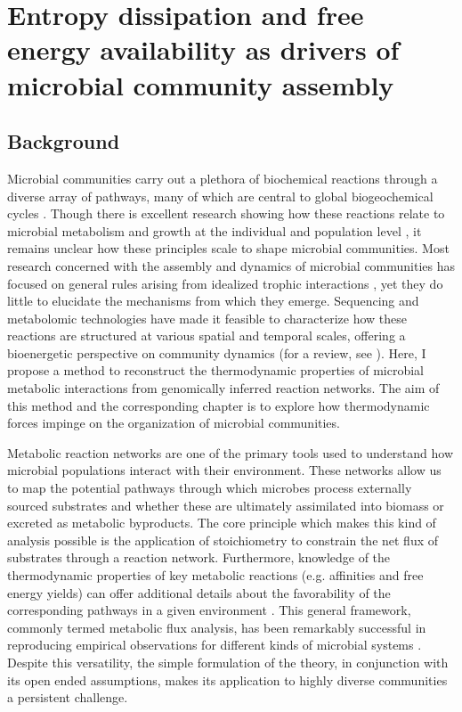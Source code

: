 \chapter{ Entropy dissipation and free energy availability as drivers of microbial community assembly}

\section{Background}

Microbial communities carry out a plethora of biochemical reactions through a diverse array of pathways, many of which are central to global biogeochemical cycles \cite{falkowski_microbial_2008}. Though there is excellent research showing how these reactions relate to microbial metabolism and growth at the individual and population level \cite{tang2017a}, it remains unclear how these principles scale to shape microbial communities. Most research concerned with the assembly and dynamics of microbial communities has focused on general rules arising from idealized trophic interactions \cite{bosi_perspectives_2017, van_den_berg_ecological_2022}, yet they do little to elucidate the mechanisms from which they emerge. Sequencing and metabolomic technologies have made it feasible to characterize how these reactions are structured at various spatial and temporal scales, offering a bioenergetic perspective on community dynamics (for a review, see \cite{kreft_genes_2017}). Here, I propose a method to reconstruct the thermodynamic properties of microbial metabolic interactions from genomically inferred reaction networks. The aim of this method and the corresponding chapter is to explore how thermodynamic forces impinge on the organization of microbial communities. 


Metabolic reaction networks are one of the primary tools used to understand how microbial populations interact with their environment. These networks allow us to map the potential pathways through which microbes process externally sourced substrates and whether these are ultimately assimilated into biomass or excreted as metabolic byproducts. The core principle which makes this kind of analysis possible is the application of stoichiometry to constrain the net flux of substrates through a reaction network. Furthermore, knowledge of the thermodynamic properties of key metabolic reactions (e.g. affinities and free energy yields) can offer additional details about the favorability of the corresponding pathways in a given environment \cite{kleerebezem2010a}. This general framework, commonly termed metabolic flux analysis, has been remarkably successful in reproducing empirical observations for different kinds of microbial systems \cite{mahadevan_dynamic_2002, basan_overflow_2015,khandelwal_community_2013}. Despite this versatility, the simple formulation of the theory, in conjunction with its open ended assumptions, makes its application to highly diverse communities a persistent challenge. 

